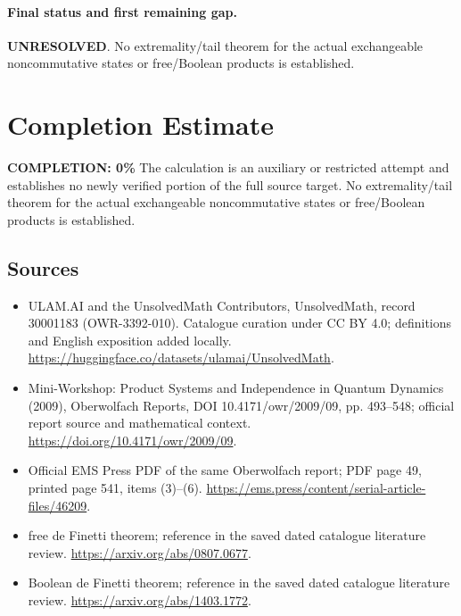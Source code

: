 \documentclass[11pt]{article}
\begin{document}
\paragraph{Final status and first remaining gap.}
\textbf{UNRESOLVED}. No extremality/tail theorem for the actual exchangeable noncommutative states or free/Boolean products is established.

\section{Completion Estimate}
\noindent\textbf{COMPLETION: 0\%}
The calculation is an auxiliary or restricted attempt and establishes no newly verified portion of the full source target. No extremality/tail theorem for the actual exchangeable noncommutative states or free/Boolean products is established.

\subsection{Sources}
\begin{itemize}
\item[\hypertarget{source:30001183:1}{S1}] ULAM.AI and the UnsolvedMath Contributors, UnsolvedMath, record 30001183 (OWR-3392-010). Catalogue curation under CC BY 4.0; definitions and English exposition added locally.
\url{https://huggingface.co/datasets/ulamai/UnsolvedMath}.
\item[\hypertarget{source:30001183:2}{S2}] Mini-Workshop: Product Systems and Independence in Quantum Dynamics (2009), Oberwolfach Reports, DOI 10.4171/owr/2009/09, pp. 493--548; official report source and mathematical context.
\url{https://doi.org/10.4171/owr/2009/09}.
\item[\hypertarget{source:30001183:3}{S3}] Official EMS Press PDF of the same Oberwolfach report; PDF page 49, printed page 541, items (3)--(6).
\url{https://ems.press/content/serial-article-files/46209}.
\item[\hypertarget{source:30001183:4}{S4}] free de Finetti theorem; reference in the saved dated catalogue literature review.
\url{https://arxiv.org/abs/0807.0677}.
\item[\hypertarget{source:30001183:5}{S5}] Boolean de Finetti theorem; reference in the saved dated catalogue literature review.
\url{https://arxiv.org/abs/1403.1772}.
\end{itemize}
\label{end:30001183}
\end{document}
